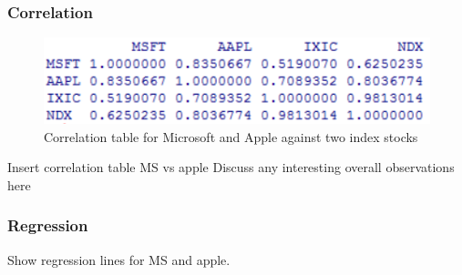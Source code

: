 \documentclass[paper=a4, fontsize=11pt]{scrartcl} %
\numberwithin{equation}{section} %
\numberwithin{figure}{section} %
\numberwithin{table}{section} %
\begin{document}
\subsubsection{Correlation}

\begin{figure}[!htb]
  \includegraphics[width=\linewidth]{graph/cor4.png}
  \caption{Correlation table for Microsoft and Apple against two index stocks}
\endminipage\hfill
\end{figure}

Insert correlation table MS vs apple
Discuss any interesting overall observations here

\subsubsection{Regression}
Show regression lines for MS and apple. 
\end{document}
